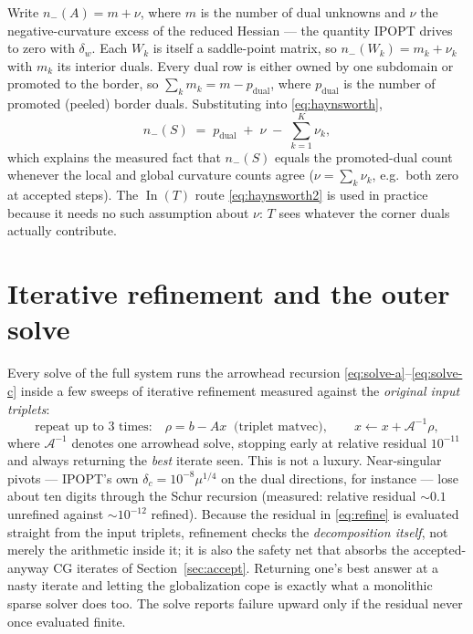 \documentclass[11pt]{article}
\newcommand{\In}{\operatorname{In}}
\begin{document}
Write $n_-(A) = m + \nu$, where $m$ is the number of dual unknowns and $\nu$
the negative-curvature excess of the reduced Hessian --- the quantity IPOPT
drives to zero with $\delta_w$.  Each $W_k$ is itself a saddle-point matrix,
so $n_-(W_k) = m_k + \nu_k$ with $m_k$ its interior duals.  Every dual row is
either owned by one subdomain or promoted to the border, so
$\sum_k m_k = m - p_{\mathrm{dual}}$, where $p_{\mathrm{dual}}$ is the
number of promoted (peeled) border duals.  Substituting into
\eqref{eq:haynsworth},
\begin{equation}
  n_-(S) \;=\; p_{\mathrm{dual}} \;+\; \nu \;-\; \sum_{k=1}^{K}\nu_k ,
  \label{eq:nu-count}
\end{equation}
which explains the measured fact that $n_-(S)$ equals the promoted-dual count
whenever the local and global curvature counts agree
($\nu = \sum_k \nu_k$, e.g.\ both zero at accepted steps).  The
$\In(T)$ route \eqref{eq:haynsworth2} is used in practice because it needs no
such assumption about $\nu$: $T$ sees whatever the corner duals actually
contribute.

\section{Iterative refinement and the outer solve}
\label{sec:refine}

Every solve of the full system runs the arrowhead recursion
\eqref{eq:solve-a}--\eqref{eq:solve-c} inside a few sweeps of iterative
refinement measured against the \emph{original input triplets}:
\begin{equation}
  \text{repeat up to 3 times:}\quad
  \rho = b - A x
  \;\;\text{(triplet matvec)},\qquad
  x \gets x + \mathcal{A}^{-1}\rho,
  \label{eq:refine}
\end{equation}
where $\mathcal{A}^{-1}$ denotes one arrowhead solve, stopping early at
relative residual $10^{-11}$ and always returning the \emph{best} iterate
seen.  This is not a luxury.  Near-singular pivots --- IPOPT's own
$\delta_c = 10^{-8}\mu^{1/4}$ on the dual directions, for instance --- lose
about ten digits through the Schur recursion (measured: relative residual
$\sim\!0.1$ unrefined against $\sim\!10^{-12}$ refined).  Because the
residual in \eqref{eq:refine} is evaluated straight from the input triplets,
refinement checks the \emph{decomposition itself}, not merely the arithmetic
inside it; it is also the safety net that absorbs the accepted-anyway CG
iterates of Section~\ref{sec:accept}.  Returning one's best answer at a nasty
iterate and letting the globalization cope is exactly what a monolithic
sparse solver does too.  The solve reports failure upward only if the
residual never once evaluated finite.
\end{document}

